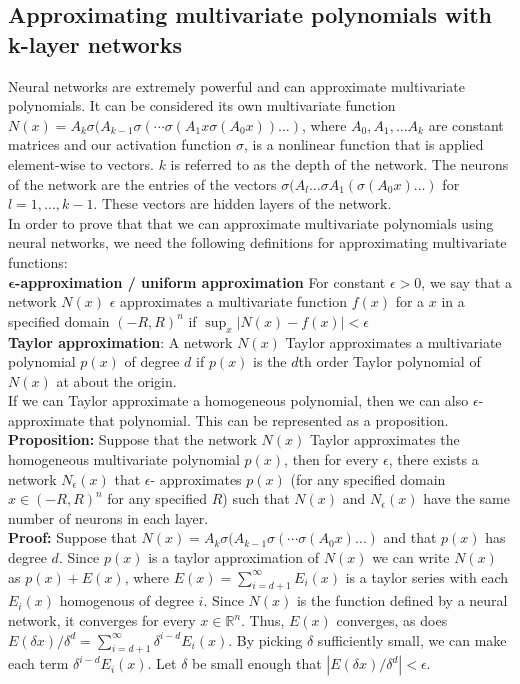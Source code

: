 \documentclass{article}
\begin{document}
\subsection{Approximating multivariate polynomials with k-layer networks \cite{paper1}}
Neural networks are extremely powerful and can approximate multivariate polynomials. It can be considered its own multivariate function $N(x) = A_k \sigma(A_{k-1} \sigma(\cdots \sigma(A_1x \sigma (A_0x))\dots)$, where $A_0,A_1,\dots A_k$ are constant matrices and our activation function $\sigma$, is a nonlinear function that is applied element-wise to vectors. $k$ is referred to as the depth of the network. The neurons of the network are the entries of the vectors $\sigma(A_l \dots \sigma A_1(\sigma (A_0 x)\dots)$ for $l=1,\dots, k-1$. These vectors are hidden layers of the network. \\
In order to prove that that we can approximate multivariate polynomials using neural networks, we need the following definitions for approximating multivariate functions: \\
\textbf{$\mathbf{\epsilon}$-approximation / uniform approximation} For constant $\epsilon>0$, we say that a network $N(x)$ $\epsilon$ approximates a multivariate function $f(x)$ for a $x$ in a specified domain $(-R,R)^n$ if $\sup_{x} |N(x)-f(x)|<\epsilon$ \\
\textbf{Taylor approximation}: A network $N(x)$ Taylor approximates a multivariate polynomial $p(x)$ of degree $d$ if $p(x)$ is the $d$th order Taylor polynomial of $N(x)$ at about the origin. \\
If we can Taylor approximate a homogeneous polynomial, then we can also $\epsilon$-approximate that polynomial. This can be represented as a proposition. \\
\textbf{Proposition:} Suppose that the network $N(x)$ Taylor approximates the homogeneous multivariate polynomial $p(x)$, then for every $\epsilon$, there exists a network $N_{\epsilon}(x)$ that $\epsilon$- approximates $p(x)$ (for any specified domain $x \in (-R,R)^n$ for any specified $R$) such that $N(x)$ and $N_{\epsilon}(x)$ have the same number of neurons in each layer. 
\\
\textbf{Proof:} Suppose that $N(x) = A_k \sigma(A_{k-1} \sigma(\cdots \sigma (A_0x)\dots)$ and that $p(x)$ has degree $d$. Since $p(x)$ is a taylor approximation of $N(x)$ we can write $N(x)$ as $p(x) + E(x)$, where $E(x) = \sum_{i=d+1}^{\infty}E_i(x)$ is a taylor series with each $E_i(x)$ homogenous of degree $i$. Since $N(x)$ is the function defined by a neural network, it converges for every $x \in \mathbb{R}^n$. Thus, $E(x)$ converges, as does $E(\delta x)/\delta^d = \sum_{i=d+1}^{\infty}\delta^{i-d}E_i(x)$. By picking $\delta$ sufficiently small, we can make each term $\delta^{i-d}E_i(x)$. Let $\delta$ be small enough that $|E(\delta x)/\delta^d|<\epsilon$. \\
\end{document}

